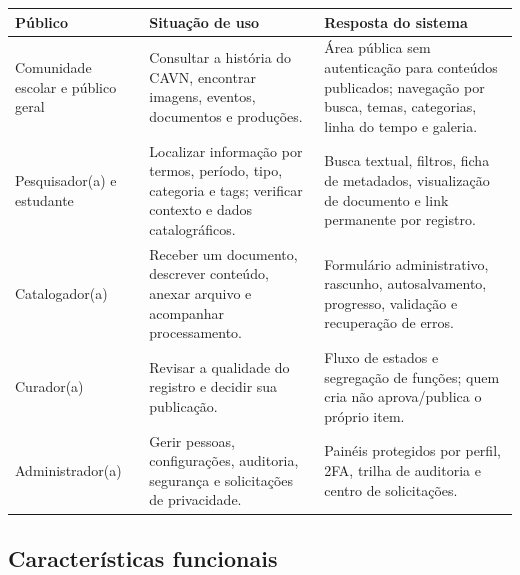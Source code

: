 \documentclass[11pt,a4paper]{article}
\begin{document}
\begin{longtable}{P{0.21\textwidth}P{0.34\textwidth}P{0.36\textwidth}}
\toprule
\textbf{Público} & \textbf{Situação de uso} & \textbf{Resposta do sistema} \\
\midrule
\endhead
\bottomrule
\endfoot
Comunidade escolar e público geral & Consultar a história do CAVN, encontrar imagens, eventos, documentos e produções. & Área pública sem autenticação para conteúdos publicados; navegação por busca, temas, categorias, linha do tempo e galeria. \\
Pesquisador(a) e estudante & Localizar informação por termos, período, tipo, categoria e tags; verificar contexto e dados catalográficos. & Busca textual, filtros, ficha de metadados, visualização de documento e link permanente por registro. \\
Catalogador(a) & Receber um documento, descrever conteúdo, anexar arquivo e acompanhar processamento. & Formulário administrativo, rascunho, autosalvamento, progresso, validação e recuperação de erros. \\
Curador(a) & Revisar a qualidade do registro e decidir sua publicação. & Fluxo de estados e segregação de funções; quem cria não aprova/publica o próprio item. \\
Administrador(a) & Gerir pessoas, configurações, auditoria, segurança e solicitações de privacidade. & Painéis protegidos por perfil, 2FA, trilha de auditoria e centro de solicitações. \\
\end{longtable}

\subsection{Características funcionais}
\end{document}
